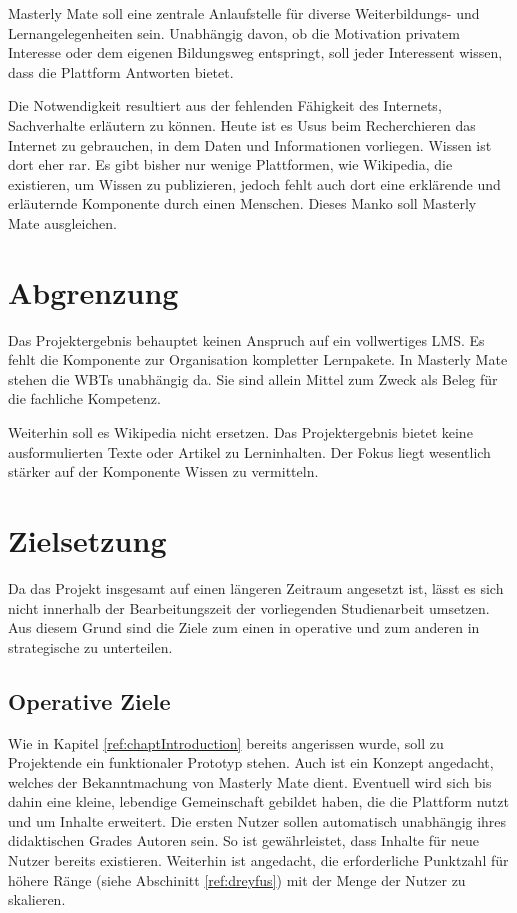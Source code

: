 Masterly Mate soll eine zentrale Anlaufstelle für diverse Weiterbildungs- und
Lernangelegenheiten sein. Unabhängig davon, ob die Motivation privatem Interesse
oder dem eigenen Bildungsweg entspringt, soll jeder Interessent wissen, dass
die Plattform Antworten bietet.

Die Notwendigkeit resultiert aus der fehlenden Fähigkeit des Internets,
Sachverhalte erläutern zu können. Heute ist es Usus beim Recherchieren das
Internet zu gebrauchen, in dem Daten und Informationen vorliegen. Wissen ist
dort eher rar. Es gibt bisher nur wenige Plattformen, wie Wikipedia, die
existieren, um Wissen zu publizieren, jedoch fehlt auch dort eine erklärende und
erläuternde Komponente durch einen Menschen. Dieses Manko soll Masterly Mate
ausgleichen.

\section{Abgrenzung}
Das Projektergebnis behauptet keinen Anspruch auf ein vollwertiges \ac{LMS}. Es
fehlt die Komponente zur Organisation kompletter Lernpakete. In Masterly Mate
stehen die WBTs unabhängig da. Sie sind allein Mittel zum Zweck als Beleg für
die fachliche Kompetenz.

Weiterhin soll es Wikipedia nicht ersetzen. Das Projektergebnis bietet keine
ausformulierten Texte oder Artikel zu Lerninhalten. Der Fokus liegt wesentlich
stärker auf der Komponente Wissen zu vermitteln.

\section{Zielsetzung}
Da das Projekt insgesamt auf einen längeren Zeitraum angesetzt ist, lässt es
sich nicht innerhalb der Bearbeitungszeit der vorliegenden Studienarbeit
umsetzen. Aus diesem Grund sind die Ziele zum einen in operative und zum anderen
in strategische zu unterteilen. 

\subsection{Operative Ziele}
Wie in Kapitel \ref{ref:chaptIntroduction} bereits angerissen wurde, soll zu
Projektende ein funktionaler Prototyp stehen. Auch ist ein Konzept angedacht,
welches der Bekanntmachung von Masterly Mate dient. Eventuell wird sich bis
dahin eine kleine, lebendige Gemeinschaft gebildet haben, die die Plattform
nutzt und um Inhalte erweitert. Die ersten Nutzer sollen automatisch unabhängig
ihres didaktischen Grades Autoren sein. So ist gewährleistet, dass Inhalte für
neue Nutzer bereits existieren. Weiterhin ist angedacht, die erforderliche
Punktzahl für höhere Ränge (siehe Abschinitt \ref{ref:dreyfus}) mit der Menge der
Nutzer zu skalieren.

